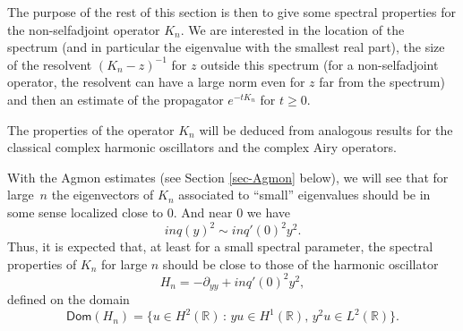 \documentclass[10pt]{amsart}
\theoremstyle{plain}
\theoremstyle{definition}
\newcommand{\set}[1]{\{ #1\}}
\newcommand{\inv}{^{-1}}
\newcommand{\1}{\mathds 1}
\newcommand{\st}{\,:\,}
\newcommand{\Dom}{\mathsf{Dom}}
\newcommand{\R}{\mathbb{R}}
\begin{document}
The purpose of the rest of this section is then to give some spectral properties for the non-selfadjoint operator $K_n$. We are interested in the location of the spectrum (and in particular the eigenvalue with the smallest real part), the size of the resolvent $(K_n-z)\inv$ for $z$ outside this spectrum (for a non-selfadjoint operator, the resolvent can have a large norm even for $z$ far from the spectrum) and then an estimate of the propagator $e^{-t K_n}$ for $t \geq 0$.

The properties of the operator $K_n$ will be deduced from analogous results for the classical complex harmonic oscillators and the complex Airy operators.

With the Agmon estimates (see Section \ref{sec-Agmon} below), we will see that for large~$n$ the eigenvectors of $K_n$ associated to ``small'' eigenvalues should be in some sense localized close to 0. And near 0 we have
\[
in q(y)^2 \sim i n q'(0)^2 y^2.
\]
Thus, it is expected that, at least for a small spectral parameter, the spectral properties of $K_n$ for large $n$ should be close to those of the harmonic oscillator
\begin{equation} \label{def-Hn}
H_n = -\partial_{yy} + i n q'(0)^2 y^2,
\end{equation}
defined on the domain
\[
\Dom(H_n) = \set{ u \in H^2(\R) \st yu \in H^1(\R),\, y^2 u \in L^2(\R)}.
\]
\end{document}
